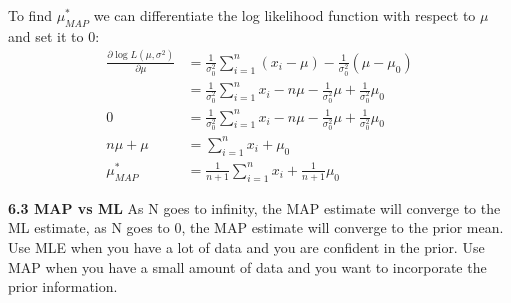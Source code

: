\documentclass{article}
\begin{document}
To find $\mu^*_{MAP}$ we can differentiate the log likelihood function with respect to $\mu$ and set it to 0:
\begin{align*}
    \frac{\partial \log L(\mu, \sigma^2)}{\partial \mu} &= \frac{1}{\sigma^2_0} \sum_{i=1}^{n} (x_i - \mu) - \frac{1}{\sigma^2_0} (\mu - \mu_0) \\
    &= \frac{1}{\sigma^2_0} \sum_{i=1}^{n} x_i - n\mu - \frac{1}{\sigma^2_0} \mu + \frac{1}{\sigma^2_0} \mu_0 \\
    0 &= \frac{1}{\sigma^2_0} \sum_{i=1}^{n} x_i - n\mu - \frac{1}{\sigma^2_0} \mu + \frac{1}{\sigma^2_0} \mu_0 \\
    n\mu + \mu &= \sum_{i=1}^{n} x_i + \mu_0 \\
    \mu^*_{MAP} &= \frac{1}{n+1} \sum_{i=1}^{n} x_i + \frac{1}{n+1} \mu_0
\end{align*}

\noindent \textbf{6.3 MAP vs ML} \newline
As N goes to infinity, the MAP estimate will converge to the ML estimate, as N goes to 0, the MAP estimate will converge to the prior mean.
Use MLE when you have a lot of data and you are confident in the prior. Use MAP when you have a small amount of data and you want to incorporate the prior information.
\end{document}
